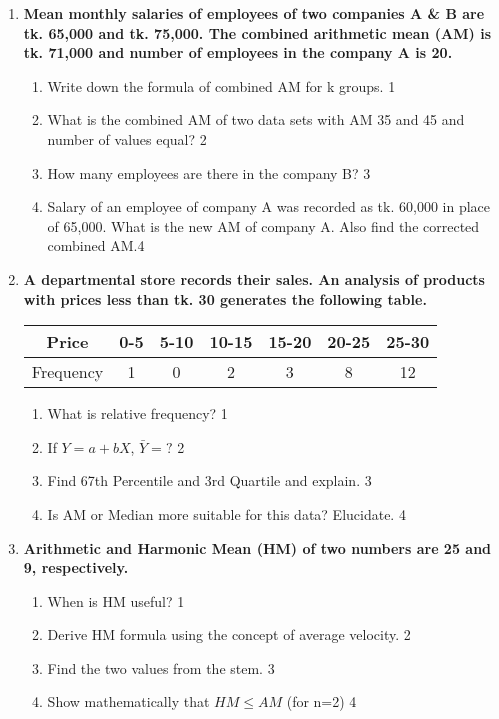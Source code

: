 \documentclass[a4paper,oneside]{book}
\begin{document}
\begin{enumerate}

   \item
	  \textbf{Mean monthly salaries of employees of two companies A \& B are tk. 65,000 and tk. 75,000. The combined arithmetic mean (AM) is tk. 71,000 and number of employees in the company A is 20.} 
	  
  \begin{enumerate}
    \item
	Write down the formula of combined AM for k groups. \hfill 1
    \item
	What is the combined AM of two data sets with AM 35 and 45 and number of values equal? \hfill 2
    \item  
	How many employees are there in the company B? \hfill 3
    \item
	Salary of an employee of company A was recorded as tk. 60,000 in place of 65,000. What is the new AM of company A. Also find the corrected combined AM.\hfill 4
  \end{enumerate}

     \item
	  \textbf{A departmental store records their sales. An analysis of products with prices less than tk. 30 generates the following table.} 
	  
\begin{table}[h]
\centering
\begin{tabular}{ccccccc}
Price     & 0-5 & 5-10 & 10-15 & 15-20 & 20-25 & 25-30 \\ \hline
Frequency & 1   & 0    & 2     & 3     & 8     & 12   
\end{tabular}
\end{table}
  
  \begin{enumerate}
    \item
	What is relative frequency? \hfill 1
    \item
	If $Y = a + bX$, $\bar Y = ?$ \hfill 2
    \item  
	Find 67th Percentile and 3rd Quartile and explain. \hfill 3
    \item
	Is AM or Median more suitable for this data? Elucidate. \hfill 4
  \end{enumerate}

   \item
	  \textbf{Arithmetic and Harmonic Mean (HM) of two numbers are 25 and 9, respectively.} 
    \begin{enumerate}
    \item
	When is HM useful? \hfill 1
    \item
	Derive HM formula using the concept of average velocity. \hfill 2
    \item  
	Find the two values from the stem. \hfill 3
    \item
	Show mathematically that $HM \le AM$ (for n=2) \hfill 4
  \end{enumerate}


\end{enumerate}
\end{document}
